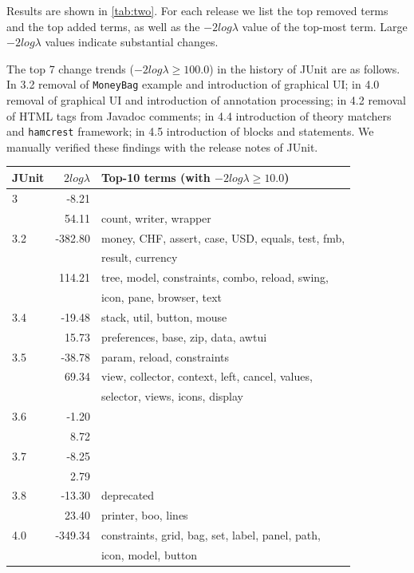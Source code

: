 Results are shown in \autoref{tab:two}. For each release we list the top removed terms and the top added terms, as well as the $-2log\lambda$ value of the top-most term. Large $-2log\lambda$ values indicate substantial changes.

The top 7 change trends (\ie $-2log\lambda \geqslant 100.0$) in the history of JUnit are as follows. In 3.2 removal of \verb$MoneyBag$ example and introduction of graphical UI; in 4.0 removal of graphical UI and introduction of annotation processing; in 4.2 removal of HTML tags from Javadoc comments; in 4.4 introduction of theory matchers and \verb$hamcrest$ framework; in 4.5 introduction of blocks and statements. We manually verified these findings with the release notes of JUnit.
 
\begin{table}
{\scriptsize \begin{center}
\begin{tabular}{lrl}
\textbf{JUnit} & $2log\lambda$ & \textbf{Top-10 terms (with $-2log\lambda \geqslant10.0$)} \\
\hline
3 & -8.21 &  \\
~ & 54.11 & count, writer, wrapper \\
\hline
3.2 & -382.80 & money, CHF, assert, case, USD, equals, test, fmb,\\~&~& result, currency \\
~ & 114.21 & tree, model, constraints, combo, reload, swing,\\~&~& icon, pane, browser, text \\
\hline
3.4 & -19.48 & stack, util, button, mouse \\
~ & 15.73 & preferences, base, zip, data, awtui \\
\hline
3.5 & -38.78 & param, reload, constraints \\
~ & 69.34 & view, collector, context, left, cancel, values,\\~&~& selector, views, icons, display \\
\hline
3.6 & -1.20 &  \\
~ & 8.72 &  \\
\hline
3.7 & -8.25 &  \\
~ & 2.79 &  \\
\hline
3.8 & -13.30 & deprecated \\
~ & 23.40 & printer, boo, lines \\
\hline
4.0 & -349.34 & constraints, grid, bag, set, label, panel, path,\\~&~& icon, model, button \\

\end{tabular}
\end{center}}
\end{table}

